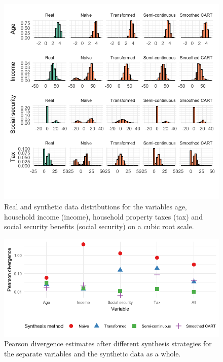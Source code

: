 \documentclass[
]{article}
\begin{document}
\begin{figure}[t]

{\centering \includegraphics[width=1\textwidth,height=\textheight]{paper_files/figure-pdf/fig-application-distributions-1.pdf}

}

\caption{\label{fig-application-distributions}Real and synthetic data
distributions for the variables age, household income (income),
household property taxes (tax) and social security benefits (social
security) on a cubic root scale.}

\end{figure}

\begin{figure}[t]

{\centering \includegraphics[width=1\textwidth,height=\textheight]{paper_files/figure-pdf/fig-application-pearson-div-1.pdf}

}

\caption{\label{fig-application-pearson-div}Pearson divergence estimates
after different synthesis strategies for the separate variables and the
synthetic data as a whole.}

\end{figure}
\end{document}
